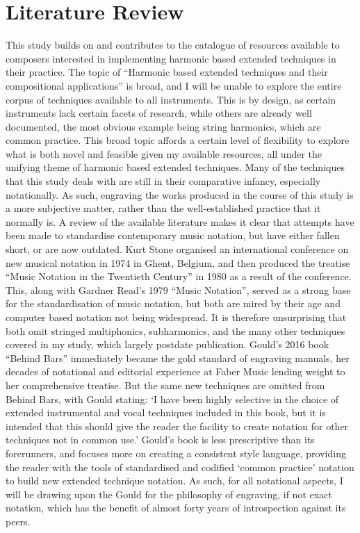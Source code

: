 \newpage
\section{Literature Review}
This study builds on and contributes to the catalogue of resources available to composers interested in implementing harmonic based extended techniques in their practice. The topic of “Harmonic based extended techniques and their compositional applications” is broad, and I will be unable to explore the entire corpus of techniques available to all instruments. This is by design, as certain instruments lack certain facets of research, while others are already well documented, the most obvious example being string harmonics, which are common practice. This broad topic affords a certain level of flexibility to explore what is both novel and feasible given my available resources, all under the unifying theme of harmonic based extended techniques.
Many of the techniques that this study deals with are still in their comparative infancy, especially notationally. As such, engraving the works produced in the course of this study is a more subjective matter, rather than the well-established practice that it normally is. A review of the available literature makes it clear that attempts have been made to standardise contemporary music notation, but have either fallen short, or are now outdated. Kurt Stone organised an international conference on new musical notation in 1974 in Ghent, Belgium, and then produced the treatise “Music Notation in the Twentieth Century” in 1980 as a result of the conference.  This, along with Gardner Read’s 1979 “Music Notation”, served as a strong base for the standardisation of music notation, but both are mired by their age and computer based notation not being widespread. It is therefore unsurprising that both omit stringed multiphonics, subharmonics, and the many other techniques covered in my study, which largely postdate publication. Gould’s 2016 book “Behind Bars” immediately became the gold standard of engraving manuals, her decades of notational and editorial experience at Faber Music lending weight to her comprehensive treatise. But the same new techniques are omitted from Behind Bars, with Gould stating: 
‘I have been highly selective in the choice of extended instrumental and vocal techniques included in this book, but it is intended that this should give the reader the facility to create notation for other techniques not in common use.’  
Gould’s book is less prescriptive than its forerunners, and focuses more on creating a consistent style language, providing the reader with the tools of standardised and codified ‘common practice’ notation to build new extended technique notation. As such, for all notational aspects, I will be drawing upon the Gould for the philosophy of engraving, if not exact notation, which has the benefit of almost forty years of introspection against its peers. 
